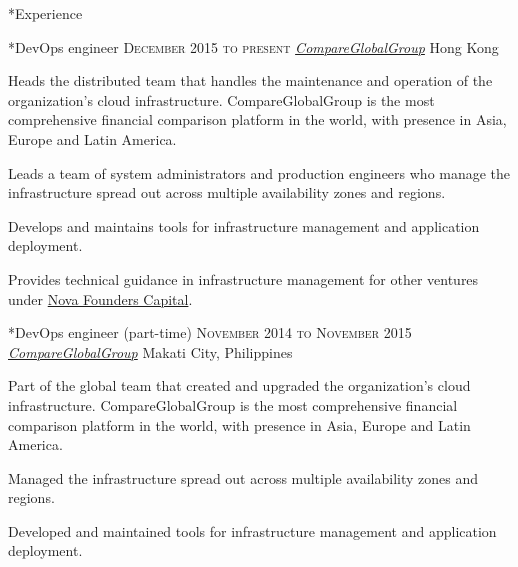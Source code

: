 \documentclass[10pt, a4paper, final]{article}
\begin{document}
\vspace{1em}

\begin{section}*{Experience}
  \begin{subsection}*{DevOps engineer \hfill\textsc{December 2015 to present}}
    \href{http://www.compareglobalgroup.com}{\textit{CompareGlobalGroup}} \hfill Hong Kong
    \vspace{1em}

    Heads the distributed team that handles the maintenance and operation of the organization's cloud infrastructure. CompareGlobalGroup is the most comprehensive financial comparison platform in the world, with presence in Asia, Europe and Latin America.
    \vspace{1em}
    \begin{compactitem}
      \item Leads a team of system administrators and production engineers who manage the infrastructure spread out across multiple availability zones and regions.
      \item Develops and maintains tools for infrastructure management and application deployment.
      \item Provides technical guidance in infrastructure management for other ventures under \href{http://www.novafounders.com/}{Nova Founders Capital}.
      
    \end{compactitem}
  \end{subsection}
  \vspace{2.5em}

  \begin{subsection}*{DevOps engineer (part-time) \hfill\textsc{November 2014 to November 2015}}
    \href{http://www.compareglobalgroup.com}{\textit{CompareGlobalGroup}} \hfill Makati City, Philippines
    \vspace{1em}

    Part of the global team that created and upgraded the organization's cloud infrastructure. CompareGlobalGroup is the most comprehensive financial comparison platform in the world, with presence in Asia, Europe and Latin America.
    \vspace{1em}
    \begin{compactitem}
      \item Managed the infrastructure spread out across multiple availability zones and regions.
      \item Developed and maintained tools for infrastructure management and application deployment.
      

\end{compactitem}
\end{subsection}
\end{section}
\end{document}
